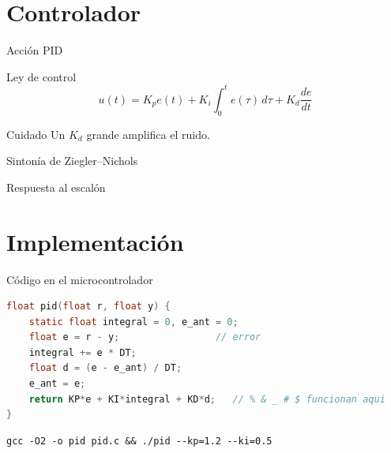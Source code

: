 \documentclass[aspectratio=169]{beamer}
\begin{document}
\section{Controlador}
\begin{frame}{Acción PID}
  \begin{block}{Ley de control}
    \[ u(t) = K_p e(t) + K_i \int_0^t e(\tau)\,d\tau + K_d \frac{de}{dt} \]
  \end{block}
  \pause
  \begin{alertblock}{Cuidado}
    Un $K_d$ grande amplifica el ruido.
  \end{alertblock}
  \pause
  \begin{exampleblock}{Sintonía de Ziegler–Nichols~\cite{zn1942}}
  \end{exampleblock}
\end{frame}

\begin{frame}{Respuesta al escalón}
  \centering
\end{frame}

\section{Implementación}
\begin{frame}[fragile]{Código en el microcontrolador}
  \begin{lstlisting}[language=C]
float pid(float r, float y) {
    static float integral = 0, e_ant = 0;
    float e = r - y;                 // error
    integral += e * DT;
    float d = (e - e_ant) / DT;
    e_ant = e;
    return KP*e + KI*integral + KD*d;   // % & _ # $ funcionan aqui
}
  \end{lstlisting}
  \begin{verbatim}
gcc -O2 -o pid pid.c && ./pid --kp=1.2 --ki=0.5
  \end{verbatim}
\end{frame}
\end{document}

